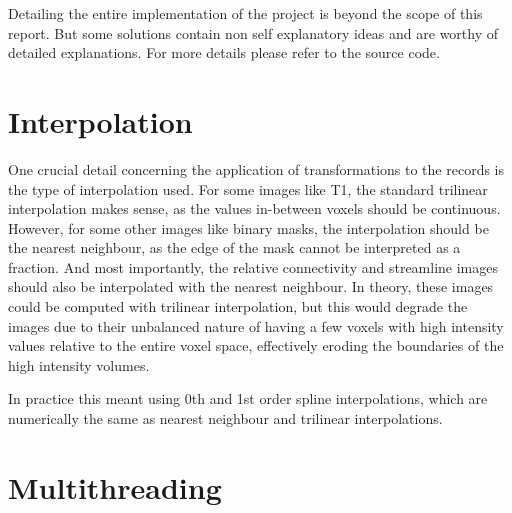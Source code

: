 \label{app:impl}

Detailing the entire implementation of the project is beyond the scope of this report. But some solutions contain non self explanatory ideas and are worthy of detailed explanations. For more details please refer to the source code.

\section{Interpolation}

One crucial detail concerning the application of transformations to the records is the type of interpolation used. For some images like T1, the standard trilinear interpolation makes sense, as the values in-between voxels should be continuous. However, for some other images like binary masks, the interpolation should be the nearest neighbour, as the edge of the mask cannot be interpreted as a fraction. And most importantly, the relative connectivity and streamline images should also be interpolated with the nearest neighbour. In theory, these images could be computed with trilinear interpolation, but this would degrade the images due to their unbalanced nature of having a few voxels with high intensity values relative to the entire voxel space, effectively eroding the boundaries of the high intensity volumes.\par
In practice this meant using 0th and 1st order spline interpolations, which are numerically the same as nearest neighbour and trilinear interpolations.

\section{Multithreading}

